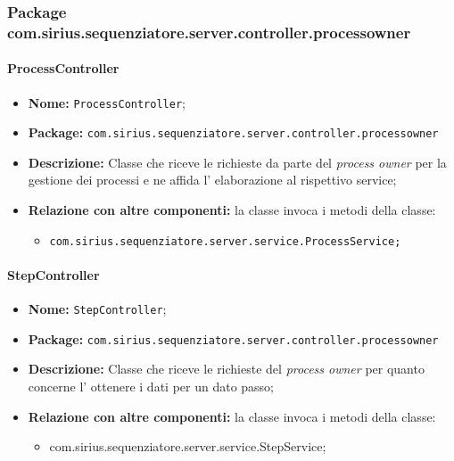 \subsubsection{Package com.sirius.sequenziatore.server.controller.processowner}
\paragraph{ProcessController}
	\begin{itemize}
		\item \textbf{Nome:} \texttt{ProcessController};
		\item \textbf{Package:} \texttt{com.sirius.sequenziatore.server.controller.processowner}
		\item \textbf{Descrizione:} Classe che riceve le richieste da parte del \textit{process owner} per la gestione dei processi e ne affida l' elaborazione al rispettivo service;
		\item \textbf{Relazione con altre componenti:} la classe invoca i metodi della classe:
		\begin{itemize}
			\item \texttt{com.sirius.sequenziatore.server.service.ProcessService;}
		\end{itemize}
	\end{itemize}
\paragraph{StepController}
	\begin{itemize}
		\item \textbf{Nome:} \texttt{StepController};
		\item \textbf{Package:} \texttt{com.sirius.sequenziatore.server.controller.processowner}
		\item \textbf{Descrizione:} Classe che riceve le richieste del \textit{process owner} per quanto concerne l' ottenere i dati per un dato passo;
		\item \textbf{Relazione con altre componenti:} la classe invoca i metodi della classe:
		\begin{itemize}
			\item com.sirius.sequenziatore.server.service.StepService;
		\end{itemize}
	\end{itemize}
